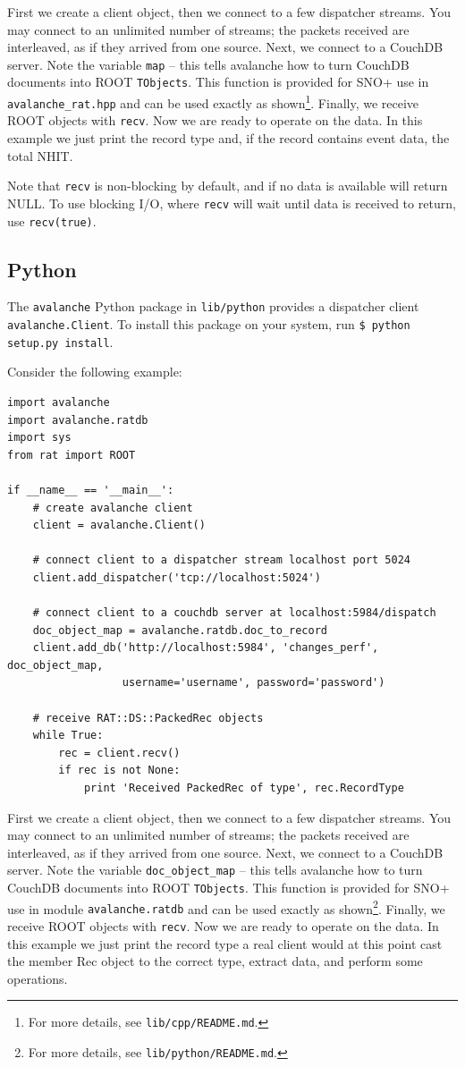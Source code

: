 \documentclass{article}
\begin{document}
First we create a client object, then we connect to a few dispatcher streams. You may connect to an unlimited number of streams; the packets received are interleaved, as if they arrived from one source. Next, we connect to a CouchDB server. Note the variable {\tt map} -- this tells avalanche how to turn CouchDB documents into ROOT {\tt TObjects}. This function is provided for SNO+ use in {\tt avalanche\_rat.hpp} and can be used exactly as shown\footnote{For more details, see {\tt lib/cpp/README.md}.}. Finally, we receive ROOT objects with {\tt recv}. Now we are ready to operate on the data. In this example we just print the record type and, if the record contains event data, the total NHIT.

Note that {\tt recv} is non-blocking by default, and if no data is available will return NULL. To use blocking I/O, where {\tt recv} will wait until data is received to return, use {\tt recv(true)}.

\subsection{Python}
The {\tt avalanche} Python package in {\tt lib/python} provides a dispatcher client {\tt avalanche.Client}. To install this package on your system, run {\tt \$ python setup.py install}.

Consider the following example:

\begin{verbatim}
import avalanche
import avalanche.ratdb
import sys
from rat import ROOT

if __name__ == '__main__':
    # create avalanche client
    client = avalanche.Client()

    # connect client to a dispatcher stream localhost port 5024
    client.add_dispatcher('tcp://localhost:5024')

    # connect client to a couchdb server at localhost:5984/dispatch
    doc_object_map = avalanche.ratdb.doc_to_record
    client.add_db('http://localhost:5984', 'changes_perf', doc_object_map,
                  username='username', password='password')

    # receive RAT::DS::PackedRec objects
    while True:
        rec = client.recv()
        if rec is not None:
            print 'Received PackedRec of type', rec.RecordType
\end{verbatim}
First we create a client object, then we connect to a few dispatcher streams. You may connect to an unlimited number of streams; the packets received are interleaved, as if they arrived from one source. Next, we connect to a CouchDB server. Note the variable {\tt doc\_object\_map} -- this tells avalanche how to turn CouchDB documents into ROOT {\tt TObjects}. This function is provided for SNO+ use in module {\tt avalanche.ratdb} and can be used exactly as shown\footnote{For more details, see {\tt lib/python/README.md}.}. Finally, we receive ROOT objects with {\tt recv}. Now we are ready to operate on the data. In this example we just print the record type a real client would at this point cast the member Rec object to the correct type, extract data, and perform some operations.
\end{document}
